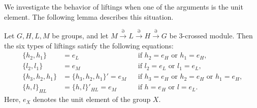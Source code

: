 \documentclass{tac}
\begin{document}
We investigate the behavior of liftings when one of the arguments is the unit element.
The following lemma describes this situation.
\begin{lemma}
\label{lemma_of_unit_element}
Let $G,H,L,M$ be groups, and let
$
 M\xrightarrow{\partial}L \xrightarrow{\partial} H \xrightarrow{\partial} G 
$ be 3-crossed module. Then the six types of liftings satisfy the following equations:
\begin{align}
\{h_2, h_1\}
  &= e_L
  && \text{if $h_2 = e_H$ or $h_1 = e_H$,}
  \label{eq:einpl} \\
 \{l_2, l_1\}
  &= e_M
  && \text{if $l_2 = e_L$ or $l_1 = e_L$,}
  \label{eq:einll} \\
\{h_3, h_2, h_1\}
  &= \{h_3, h_2, h_1\}' = e_M
  && \text{if $h_3 = e_H$ or $h_2 = e_H$ or $h_1 = e_H$,}
  \label{eq:einhmn} \\
\{h, l\}_{HL}
  &= \{h, l\}'_{HL} = e_M
  && \text{if $h = e_H$ or $l = e_L$.}
  \label{eq:einhl}
\end{align}
Here, $e_X$ denotes the unit element of the group $X$. 
\end{lemma}
\end{document}
